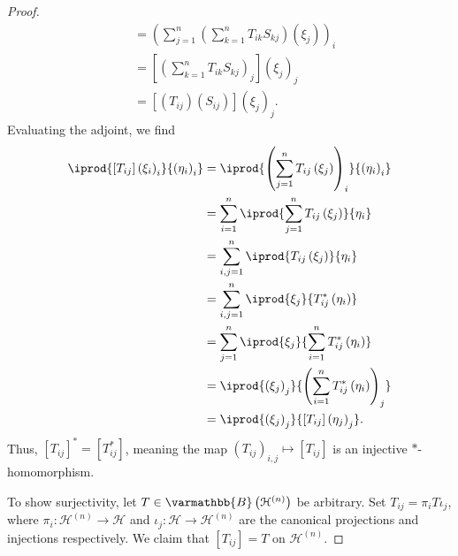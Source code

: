 \documentclass[10pt]{mypackage}
\renewcommand*{\mathbb}[1]{\varmathbb{#1}}
\newcommand{\B}{\mathbb{B}}
\begin{document}
\begin{proof}
\begin{align*}
                                                                       &= \left(\sum_{j=1}^{n}\left(\sum_{k=1}^{n}T_{ik}S_{kj}\right)\left(\xi_j\right)\right)_{i}\\
                                                                       &= \left[\left(\sum_{k=1}^{n}T_{ik}S_{kj}\right)_{j}\right]\left(\xi_j\right)_j\\
                                                                       &= \left[\left(T_{ij}\right)\left(S_{ij}\right)\right]\left(\xi_j\right)_j.
  \end{align*}
  Evaluating the adjoint, we find
  \begin{align*}
    \iprod{\left[T_{ij}\right]\left(\xi_i\right)_i}{\left(\eta_i\right)_i} &= \iprod{\left(\sum_{j=1}^{n}T_{ij}\left(\xi_j\right)\right)_i}{\left(\eta_i\right)_i}\\
                                                                           &= \sum_{i=1}^n \iprod{\sum_{j=1}^{n}T_{ij}\left(\xi_j\right)}{\eta_i}\\
                                                                           &= \sum_{i,j=1}^{n} \iprod{T_{ij}\left(\xi_j\right)}{\eta_i}\\
                                                                           &= \sum_{i,j=1}^{n} \iprod{\xi_j}{T_{ij}^{\ast}\left(\eta_i\right)}\\
                                                                           &= \sum_{j=1}^{n} \iprod{\xi_j}{\sum_{i=1}^{n}T_{ij}^{\ast}\left(\eta_i\right)}\\
                                                                           &= \iprod{\left(\xi_j\right)_j}{\left(\sum_{i=1}^{n}T_{ij}^{\ast}\left(\eta_i\right)\right)_{j}}\\
                                                                           &= \iprod{\left(\xi_j\right)_j}{\left[T_{ij}\right]\left(\eta_j\right)_j}.
  \end{align*}
  Thus, $\left[T_{ij}\right]^{\ast} = \left[T_{ij}^{\ast}\right]$, meaning the map $\left(T_{ij}\right)_{i,j}\mapsto \left[T_{ij}\right]$ is an injective $\ast$-homomorphism.\newline

  To show surjectivity, let $T\in \B\left(\mathcal{H}^{(n)}\right)$ be arbitrary. Set $T_{ij} = \pi_iT\iota_j$, where $\pi_i\colon \mathcal{H}^{(n)}\rightarrow \mathcal{H}$ and $\iota_j\colon \mathcal{H}\rightarrow \mathcal{H}^{(n)}$ are the canonical projections and injections respectively. We claim that $\left[T_{ij}\right] = T$ on $\mathcal{H}^{(n)}$.\newline


\end{proof}
\end{document}
